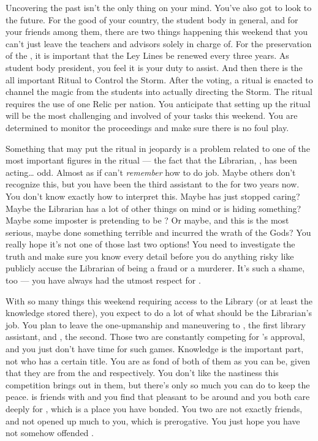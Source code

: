 \documentclass[char]{GL2020}
\begin{document}
Uncovering the past isn't the only thing on your mind. You've also got to look to the future. For the good of your country, the student body in general, and for your friends among them, there are two things happening this weekend that you can't just leave the teachers and advisors solely in charge of. For the preservation of the \pSc{}, it is important that the Ley Lines be renewed every three years. As student body president, you feel it is your duty to assist. And then there is the all important Ritual to Control the Storm. After the voting, a ritual is enacted to channel the magic from the students into actually directing the Storm. The ritual requires the use of one Relic per nation. You anticipate that setting up the ritual will be the most challenging and involved of your tasks this weekend. You are determined to monitor the proceedings and make sure there is no foul play.

Something that may put the ritual in jeopardy is a problem related to one of the most important figures in the ritual — the fact that the Librarian, \cLibrarian{\full}, has been acting\ldots{} odd. Almost as if \cLibrarian{\they} can't \emph{remember} how to do \cLibrarian{\their} job. Maybe others don’t recognize this, but you have been the third assistant to the \cLibrarian{} for two years now. You don’t know exactly how to interpret this. Maybe \cLibrarian{} has just stopped caring? Maybe the Librarian has a lot of other things on \cLibrarian{\their} mind or is hiding something? Maybe some imposter is pretending to be \cLibrarian{\them}? Or maybe, and this is the most serious, maybe \cLibrarian{\theyhave} done something terrible and incurred the wrath of the Gods? You really hope it's not one of those last two options! You need to investigate the truth and make sure you know every detail before you do anything risky like publicly accuse the Librarian of being a fraud or a murderer. It's such a shame, too — you have always had the utmost respect for \cLibrarian{}.

With so many things this weekend requiring access to the Library (or at least the knowledge stored there), you expect to do a lot of what should be the Librarian’s job. You plan to leave the one-upmanship and maneuvering to \cAmbition{\full}, the first library assistant, and \cLibAssist{\full}, the second. Those two are constantly competing for \cLibrarian{}’s approval, and you just don’t have time for such games. Knowledge is the important part, not who has a certain title. You are as fond of both of them as you can be, given that they are from the \pTech{} and \pFarm{} respectively. You don't like the nastiness this competition brings out in them, but there's only so much you can do to keep the peace. \cAmbition{} is friends with \cHeir{} and you find that \cAmbition{\theyare} pleasant to be around and you both care deeply for \cHeir{}, which is a place you have bonded. You two are not exactly friends, and \cAmbition{\theyhave} not opened up much to you, which is \cAmbition{\their} prerogative. You just hope you have not somehow offended \cAmbition{\them}.
\end{document}
